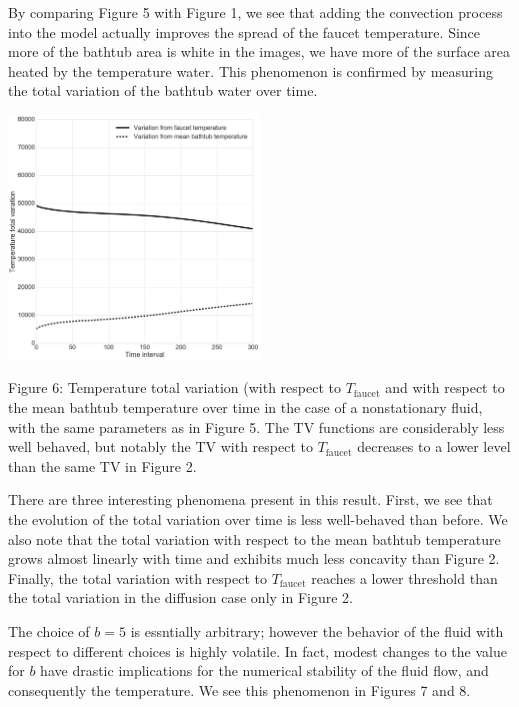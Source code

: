 \documentclass[12pt]{amsart}
\begin{document}
By comparing Figure 5 with Figure 1, we see that adding the convection process
into the model actually improves the spread of the faucet temperature. Since
more of the bathtub area is white in the images, we have more of the surface
area heated by the temperature water. This phenomenon is confirmed by measuring
the total variation of the bathtub water over time.

\begin{center}
    \includegraphics[width=0.5\textwidth]{../plots/tv-03.png}

    \justify
    \footnotesize{
    Figure 6: Temperature total variation (with respect to $T_{\mathrm{faucet}}$
    and with respect to the mean bathtub temperature over time in the case of a
    nonstationary fluid, with the same parameters as in Figure 5. The TV
    functions are considerably less well behaved, but notably the TV with
    respect to $T_{\mathrm{faucet}}$ decreases to a lower level than the same TV
in Figure 2.}
\end{center}

There are three interesting phenomena present in this result. First, we see that
the evolution of the total variation over time is less well-behaved than before.
We also note that the total variation with respect to the mean bathtub
temperature grows almost linearly with time and exhibits much less concavity
than Figure 2. Finally, the total variation with respect to
$T_{\mathrm{faucet}}$ reaches a lower threshold than the total variation in the
diffusion case only in Figure 2.

The choice of $b=5$ is essntially arbitrary; however the behavior of the fluid
with respect to different choices is highly volatile. In fact, modest changes to
the value for $b$ have drastic implications for the numerical stability of the
fluid flow, and consequently the temperature. We see this phenomenon in Figures
7 and 8. 
\end{document}
